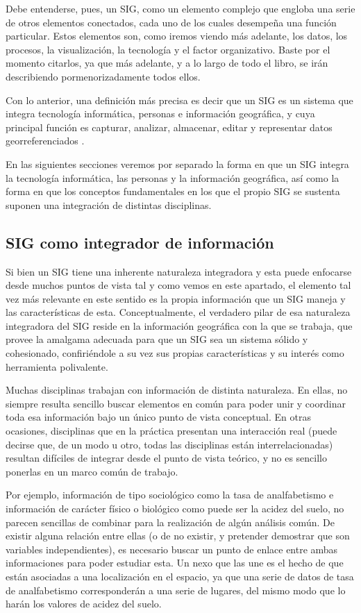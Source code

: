 Debe entenderse, pues, un SIG, como un elemento complejo que engloba una serie de otros elementos conectados, cada uno de los cuales desempeña una función particular. Estos elementos son, como iremos viendo más adelante, los datos, los procesos, la visualización, la tecnología y el factor organizativo. Baste por el momento citarlos, ya que más adelante, y a lo largo de todo el libro, se irán describiendo pormenorizadamente todos ellos.

Con lo anterior, una definición más precisa es decir que un SIG es un sistema que integra tecnología informática, personas e información geográfica\cite{webGISCOM}, y cuya principal función es capturar, analizar, almacenar, editar y representar datos georreferenciados \cite{Korte2001Autodesk}.

En las siguientes secciones veremos por separado la forma en que un SIG integra la tecnología informática, las personas y la información geográfica, así como la forma en que los conceptos fundamentales en los que el propio SIG se sustenta suponen una integración de distintas disciplinas.

\subsection{SIG como integrador de información}

Si bien un SIG tiene una inherente naturaleza integradora y esta puede enfocarse desde muchos puntos de vista tal y como vemos en este apartado, el elemento tal vez más relevante en este sentido es la propia información que un SIG maneja y las características de esta. Conceptualmente, el verdadero pilar de esa naturaleza integradora del SIG reside en la información geográfica con la que se trabaja, que provee la amalgama adecuada para que un SIG sea un sistema sólido y cohesionado, confiriéndole a su vez sus propias características y su interés como herramienta polivalente.

Muchas disciplinas trabajan con información de distinta naturaleza. En ellas, no siempre resulta sencillo buscar elementos en común para poder unir y coordinar toda esa información bajo un único punto de vista conceptual. En otras ocasiones, disciplinas que en la práctica presentan una interacción real (puede decirse que, de un modo u otro, todas las disciplinas están interrelacionadas) resultan difíciles de integrar desde el punto de vista teórico, y no es sencillo ponerlas en un marco común de trabajo.

Por ejemplo, información de tipo sociológico como la tasa de analfabetismo e información de carácter físico o biológico como puede ser la acidez del suelo, no parecen sencillas de combinar para la realización de algún análisis común. De existir alguna relación entre ellas (o de no existir, y pretender demostrar que son variables independientes), es necesario buscar un punto de enlace entre ambas informaciones para poder estudiar esta. Un nexo que las une es el hecho de que están asociadas a una localización en el espacio, ya que una serie de datos de tasa de analfabetismo corresponderán a una serie de lugares, del mismo modo que lo harán los valores de acidez del suelo. 

